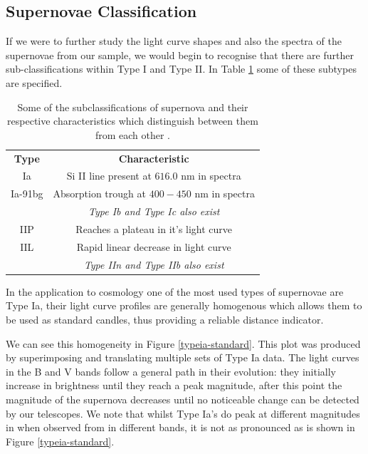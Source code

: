 \documentclass[twocolumn]{revtex4}
\begin{document}
\vspace{-3ex}
\subsection{Supernovae Classification}
\vspace{-2ex}

If we were to further study the light curve shapes and also the spectra of the supernovae from our sample, we would begin to recognise that there are further sub-classifications within Type I and Type II. In Table \ref{sn_classes} some of these subtypes are specified.

\begin{table}[h!]
\centering
\begin{tabular}{c@{\hskip 20pt}c} 
 \hline
 \textbf{Type} & \textbf{Characteristic} \\ 
 Ia		& Si II line present at $616.0$ nm in spectra \\
 Ia-91bg	& Absorption trough at $400-450$ nm in spectra \\
 		& \em Type Ib and Type Ic also exist \em \\
 IIP 		& Reaches a plateau in it's light curve  \\
 IIL		& Rapid linear decrease in light curve \\
 		& \em Type IIn and Type IIb also exist \em \\
 \hline
\end{tabular}
\caption{Some of the subclassifications of supernova and their respective characteristics which distinguish between them from each other \cite{longair, obs_phys_class_sn}.}
\label{sn_classes}
\end{table}

In the application to cosmology one of the most used types of supernovae are Type Ia, their light curve profiles are generally homogenous which allows them to be used as standard candles, thus providing a reliable distance indicator.  

We can see this homogeneity in Figure \ref{typeia-standard}. This plot was produced by superimposing and translating multiple sets of Type Ia data. The light curves in the B and V bands follow a general path in their evolution: they initially increase in brightness until they reach a peak magnitude, after this point the magnitude of the supernova decreases until no noticeable change can be detected by our telescopes. We note that whilst Type Ia's do peak at different magnitudes in when observed from in different bands, it is not as pronounced as is shown in Figure \ref{typeia-standard}.
\end{document}
